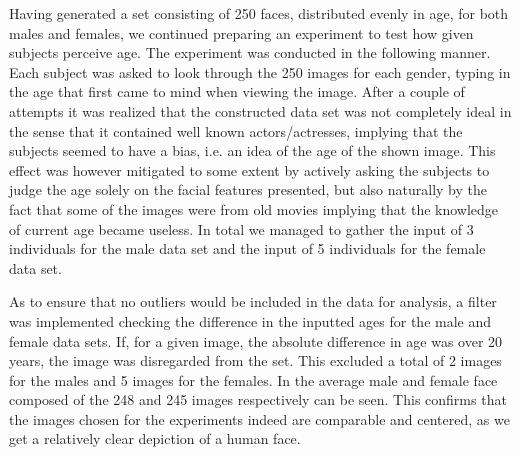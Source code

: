 Having generated a set consisting of 250 faces, distributed evenly in age, for both males and females, we continued preparing an experiment to test how given subjects perceive age. The experiment was conducted in the following manner. Each subject was asked to look through the 250 images for each gender, typing in the age that first came to mind when viewing the image. After a couple of attempts it was realized that the constructed data set was not completely ideal in the sense that it contained well known actors/actresses, implying that the subjects seemed to have a bias, i.e. an idea of the age of the shown image. This effect was however mitigated to some extent by actively asking the subjects to judge the age solely on the facial features presented, but also naturally by the fact that some of the images were from old movies implying that the knowledge of current age became useless. In total we managed to gather the input of 3 individuals for the male data set and the input of 5 individuals for the female data set.

As to ensure that no outliers would be included in the data for analysis, a filter was implemented checking the difference in the inputted ages for the male and female data sets. If, for a given image, the absolute difference in age was over 20 years, the image was disregarded from the set. This excluded a total of 2 images for the males and 5 images for the females. In  the average male and female face composed of the 248 and 245 images respectively can be seen. This confirms that the images chosen for the experiments indeed are comparable and centered, as we get a relatively clear depiction of a human face. 

